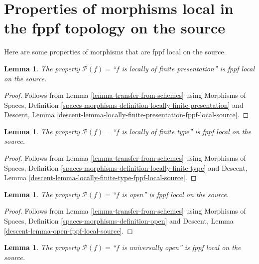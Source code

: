\documentclass{stacks-project}
\theoremstyle{plain}
\newtheorem{lemma}[subsection]{Lemma}
\theoremstyle{definition}
\theoremstyle{remark}
\numberwithin{equation}{subsection}
\begin{document}
\section{Properties of morphisms local in the fppf topology on the source}
\label{section-fppf-local-source}

\noindent
Here are some properties of morphisms that are fppf local on the source.

\begin{lemma}
\label{lemma-locally-finite-presentation-fppf-local-source}
The property $\mathcal{P}(f)=$``$f$ is locally of finite presentation''
is fppf local on the source.
\end{lemma}

\begin{proof}
Follows from
Lemma \ref{lemma-transfer-from-schemes}
using
Morphisms of Spaces,
Definition \ref{spaces-morphisms-definition-locally-finite-presentation}
and
Descent,
Lemma \ref{descent-lemma-locally-finite-presentation-fppf-local-source}.
\end{proof}

\begin{lemma}
\label{lemma-locally-finite-type-fppf-local-source}
The property $\mathcal{P}(f)=$``$f$ is locally of finite type''
is fppf local on the source.
\end{lemma}

\begin{proof}
Follows from
Lemma \ref{lemma-transfer-from-schemes}
using
Morphisms of Spaces,
Definition \ref{spaces-morphisms-definition-locally-finite-type}
and
Descent, Lemma \ref{descent-lemma-locally-finite-type-fppf-local-source}.
\end{proof}

\begin{lemma}
\label{lemma-open-fppf-local-source}
The property $\mathcal{P}(f)=$``$f$ is open''
is fppf local on the source.
\end{lemma}

\begin{proof}
Follows from
Lemma \ref{lemma-transfer-from-schemes}
using
Morphisms of Spaces, Definition \ref{spaces-morphisms-definition-open}
and
Descent, Lemma \ref{descent-lemma-open-fppf-local-source}.
\end{proof}

\begin{lemma}
\label{lemma-universally-open-fppf-local-source}
The property $\mathcal{P}(f)=$``$f$ is universally open''
is fppf local on the source.
\end{lemma}
\end{document}
